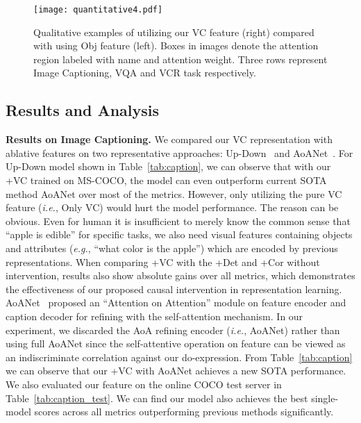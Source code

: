 \documentclass[10pt,twocolumn,letterpaper]{article}
\newcommand\ies{\textit{i.e.}}
\newcommand\egs{\textit{e.g.}}
\begin{document}
\begin{figure*}[!htb]
\begin{center}
\texttt{[image: quantitative4.pdf]}
\end{center}
\vspace{-0.3cm}
  \caption{Qualitative examples of utilizing our VC feature (right) compared with using Obj feature (left). Boxes in images denote the attention region labeled with name and attention weight. Three rows represent Image Captioning, VQA and VCR task respectively.}
\label{fig:quant}
\vspace{-0.3cm}
\end{figure*}




\subsection{Results and Analysis}
\label{sec:results}

\noindent\textbf{Results on Image Captioning.}
We compared our VC representation with ablative features on two representative approaches: Up-Down~\cite{anderson2018bottom} and AoANet~\cite{huang2019attention}.
For Up-Down model shown in Table~\ref{tab:caption}, we can observe that with our +VC trained on MS-COCO, the model can even outperform current SOTA method AoANet over most of the metrics.
However, only utilizing the pure VC feature (\ies, Only VC) would hurt the model performance. The reason can be obvious.
Even for human it is insufficient to merely know the common sense that ``apple is edible'' for specific tasks, we also need visual features containing objects and attributes (\egs, ``what color is the apple'') which are encoded by previous representations. 
When comparing +VC with the +Det and +Cor without intervention, results also show absolute gains over all metrics, which demonstrates the effectiveness of our proposed causal intervention in representation learning.
AoANet~\cite{huang2019attention} proposed an ``Attention on Attention'' module on feature encoder and caption decoder for refining with the self-attention mechanism.
In our experiment, we discarded the AoA refining encoder (\ies, AoANet) rather than using full AoANet since the self-attentive operation on feature can be viewed as an indiscriminate correlation against our do-expression.
From Table~\ref{tab:caption} we can observe that our +VC with AoANet achieves a new SOTA performance.
We also evaluated our feature on the online COCO test server in Table~\ref{tab:caption_test}. We can find our model also achieves the best single-model scores across all metrics outperforming previous methods significantly.
\end{document}
